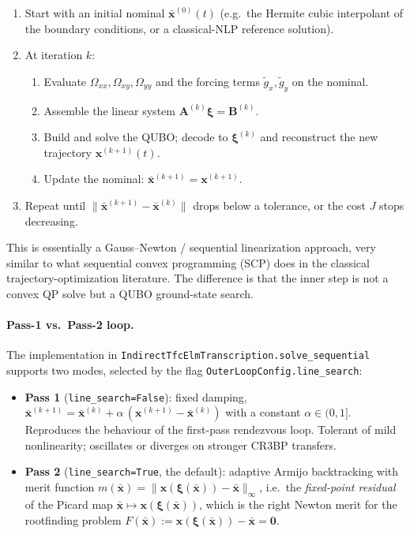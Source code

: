 \documentclass[8pt,a4paper]{article}
\newcommand{\bvec}[1]{\bm{#1}}
\newcommand{\xvec}{\bvec{x}}
\newcommand{\Omegaxx}{\Omega_{xx}}
\newcommand{\Omegayy}{\Omega_{yy}}
\newcommand{\Omegaxy}{\Omega_{xy}}
\newcommand{\Amat}{\bvec{A}}
\newcommand{\Bmat}{\bvec{B}}
\theoremstyle{definition}
\theoremstyle{remark}
\begin{document}
\begin{enumerate}[leftmargin=1.5em]
  \item Start with an initial nominal $\bar{\xvec}^{(0)}(t)$
    (e.g.\ the Hermite cubic interpolant of the boundary conditions,
    or a classical-NLP reference solution).
  \item At iteration $k$:
    \begin{enumerate}[leftmargin=1.5em, itemsep=1pt]
      \item Evaluate $\Omegaxx, \Omegaxy, \Omegayy$ and the forcing
        terms $\tilde g_x, \tilde g_y$ on the nominal.
      \item Assemble the linear system $\Amat^{(k)} \bm\xi = \Bmat^{(k)}$.
      \item Build and solve the QUBO; decode to $\bm\xi^{(k)}$ and
        reconstruct the new trajectory $\xvec^{(k+1)}(t)$.
      \item Update the nominal: $\bar{\xvec}^{(k+1)} = \xvec^{(k+1)}$.
    \end{enumerate}
  \item Repeat until $\|\bar{\xvec}^{(k+1)} - \bar{\xvec}^{(k)}\|$
    drops below a tolerance, or the cost $J$ stops decreasing.
\end{enumerate}

This is essentially a Gauss--Newton / sequential linearization
approach, very similar to what sequential convex programming (SCP)
does in the classical trajectory-optimization literature. The
difference is that the inner step is not a convex QP solve but a
QUBO ground-state search.

\paragraph{Pass-1 vs.\ Pass-2 loop.}
The implementation in
\texttt{IndirectTfcElmTranscription.solve\_sequential} supports two
modes, selected by the flag \texttt{OuterLoopConfig.line\_search}:

\begin{itemize}[leftmargin=1.5em, itemsep=1pt]
  \item \textbf{Pass 1} (\texttt{line\_search=False}): fixed damping,
    $\bar{\xvec}^{(k+1)} = \bar{\xvec}^{(k)} + \alpha\,(\xvec^{(k+1)} - \bar{\xvec}^{(k)})$
    with a constant $\alpha \in (0, 1]$. Reproduces the behaviour of
    the first-pass rendezvous loop. Tolerant of mild nonlinearity;
    oscillates or diverges on stronger CR3BP transfers.
  \item \textbf{Pass 2} (\texttt{line\_search=True}, the default):
    adaptive Armijo backtracking with merit function
    $m(\bar{\xvec}) = \|\xvec(\bm\xi(\bar{\xvec})) - \bar{\xvec}\|_\infty$,
    i.e.\ the \emph{fixed-point residual} of the Picard map
    $\bar{\xvec} \mapsto \xvec(\bm\xi(\bar{\xvec}))$, which is the
    right Newton merit for the rootfinding problem
    $F(\bar{\xvec}) := \xvec(\bm\xi(\bar{\xvec})) - \bar{\xvec} = \bm 0$.
\end{itemize}
\end{document}

